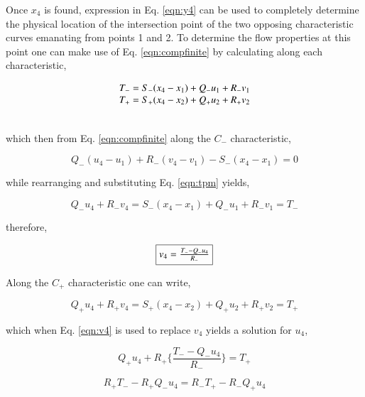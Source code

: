 	Once $x_4$ is found, expression in Eq. \ref{eqn:y4} can be used to completely
determine the physical location of the intersection point of the two opposing characteristic
curves emanating from points 1 and 2.  To determine the flow properties at this point one
can make use of Eq. \ref{eqn:compfinite} by calculating along each characteristic,

\begin{equation}
	\begin{array}{c}
	T_{-} = S_{-}(x_4 - x_1) + Q_{-}u_1 + R_{-}v_1 \\ \vspace{0.5cm}
	T_{+} = S_{+}(x_4 - x_2) + Q_{+}u_2 + R_{+}v_2
	\end{array}
\label{eqn:tpm}
\end{equation}

	which then from Eq. \ref{eqn:compfinite} along the $C_-$ characteristic,

\begin{displaymath}
	Q_-(u_4 - u_1) + R_-(v_4 - v_1) -S_-(x_4 - x_1) = 0
\end{displaymath}

	while rearranging and substituting Eq. \ref{eqn:tpm} yields,

\begin{displaymath}
	Q_-u_4 + R_-v_4 = S_-(x_4 - x_1) + Q_-u_1 + R_-v_1 = T_-
\end{displaymath}

	therefore,

\begin{equation}
	\fbox{$
	v_4 = \frac{T_- - Q_-u_4}{R_-}
	$}
\label{eqn:v4}
\end{equation}

	Along the $C_+$ characteristic one can write,

\begin{displaymath}
	Q_+u_4 + R_+v_4 = S_+(x_4 - x_2) + Q_+u_2 + R_+v_2 = T_+ 
\end{displaymath}

	which when Eq. \ref{eqn:v4} is used to replace $v_4$ yields a solution for $u_4$,

\begin{displaymath}
	Q_+u_4 + R_+\Big\{\frac{T_- - Q_-u_4}{R_-}\Big\} = T_+ 
\end{displaymath}

\begin{displaymath}
	R_+T_- - R_+Q_-u_4 = R_-T_+ - R_-Q_+u_4 
\end{displaymath}

